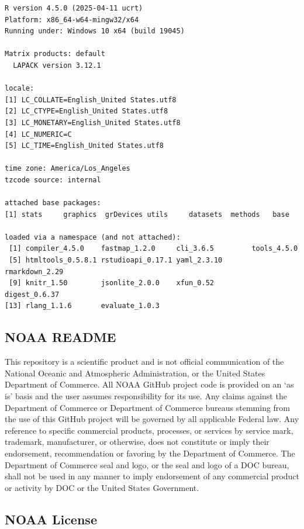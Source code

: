 \documentclass[
  letterpaper,
  oneside,
  open=any]{scrbook}
\begin{document}
\begin{verbatim}
R version 4.5.0 (2025-04-11 ucrt)
Platform: x86_64-w64-mingw32/x64
Running under: Windows 10 x64 (build 19045)

Matrix products: default
  LAPACK version 3.12.1

locale:
[1] LC_COLLATE=English_United States.utf8 
[2] LC_CTYPE=English_United States.utf8   
[3] LC_MONETARY=English_United States.utf8
[4] LC_NUMERIC=C                          
[5] LC_TIME=English_United States.utf8    

time zone: America/Los_Angeles
tzcode source: internal

attached base packages:
[1] stats     graphics  grDevices utils     datasets  methods   base     

loaded via a namespace (and not attached):
 [1] compiler_4.5.0    fastmap_1.2.0     cli_3.6.5         tools_4.5.0      
 [5] htmltools_0.5.8.1 rstudioapi_0.17.1 yaml_2.3.10       rmarkdown_2.29   
 [9] knitr_1.50        jsonlite_2.0.0    xfun_0.52         digest_0.6.37    
[13] rlang_1.1.6       evaluate_1.0.3   
\end{verbatim}

\subsection{NOAA README}\label{noaa-readme-1}

This repository is a scientific product and is not official
communication of the National Oceanic and Atmospheric Administration, or
the United States Department of Commerce. All NOAA GitHub project code
is provided on an `as is' basis and the user assumes responsibility for
its use. Any claims against the Department of Commerce or Department of
Commerce bureaus stemming from the use of this GitHub project will be
governed by all applicable Federal law. Any reference to specific
commercial products, processes, or services by service mark, trademark,
manufacturer, or otherwise, does not constitute or imply their
endorsement, recommendation or favoring by the Department of Commerce.
The Department of Commerce seal and logo, or the seal and logo of a DOC
bureau, shall not be used in any manner to imply endorsement of any
commercial product or activity by DOC or the United States Government.

\subsection{NOAA License}\label{noaa-license-1}
\end{document}
